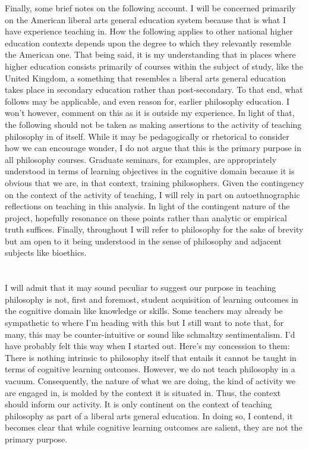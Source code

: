 \documentclass[letterpaper,notitlepage,12pt]{article}
\begin{document}
Finally, some brief notes on the following account.
I will be concerned primarily on the American liberal arts general education
system because that is what I have experience teaching in.
How the following applies to other national higher education contexts depends
upon the degree to which they relevantly resemble the American one.
That being said, it is my understanding that in places where higher education
consists primarily of courses within the subject of study, like the United
Kingdom, a something that resembles a liberal arts general education takes
place in secondary education rather than post-secondary.
To that end, what follows may be applicable, and even reason for, earlier
philosophy education.
I won't however, comment on this as it is outside my experience.
In light of that, the following should not be taken as making
assertions to the activity of teaching philosophy in of itself.
While it may be pedagogically or rhetorical to consider how we can encourage
wonder, I do not argue that this is the primary purpose in all philosophy
courses.
Graduate seminars, for examples, are appropriately understood in terms of
learning objectives in the cognitive domain because it is obvious that we are,
in that context, training philosophers.
Given the contingency on the context of the activity of teaching, I will rely in
part on autoethnographic reflections on teaching in this analysis.
In light of the contingent nature of the project, hopefully resonance on these
points rather than analytic or empirical truth suffices.
Finally, throughout I will refer to philosophy for the sake of brevity  but am 
open to it being understood in the sense of philosophy and adjacent subjects 
like bioethics.

\section{}

I will admit that it may sound peculiar to suggest our purpose in teaching
philosophy is not, first and foremost, student acquisition of learning outcomes
in the cognitive domain like knowledge or skills.
Some teachers may already be sympathetic to where I'm heading with this but I
still want to note that, for many, this may be counter-intuitive or sound like
schmaltzy sentimentalism.
I'd have probably felt this way when I started out.
Here's my concession to them: There is nothing intrinsic to philosophy itself
that entails it cannot be taught in terms of cognitive learning outcomes.
However, we do not teach philosophy in a vacuum.
Consequently, the nature of what we are doing, the kind of activity we are
engaged in, is molded by the context it is situated in.
Thus, the context should inform our activity.
It is only continent on the context of teaching philosophy as part of a liberal
arts general education.
In doing so, I contend, it becomes clear that while cognitive learning outcomes
are salient, they are not the primary purpose.
\end{document}
